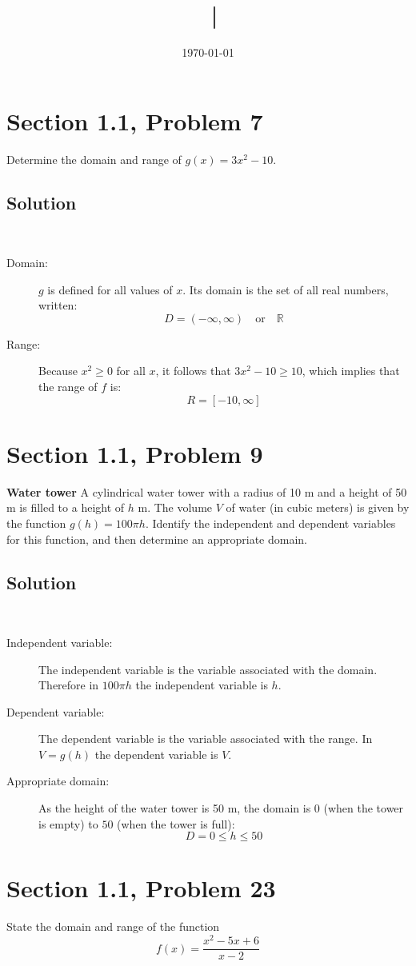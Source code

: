 \documentclass{article}
\title{\classname\ | \assignment}
\author{\authorname}
\date{\today}
\newcommand{\problem}[2]{\vspace{5ex}\section*{Section #1, Problem #2}}
\newcommand{\solution}{\subsection*{Solution}}
\begin{document}
\maketitle

\problem{1.1}{7}
Determine the domain and range of $ g(x) = 3x^2 - 10 $.

\solution\
\begin{description}
  \item[Domain:] $g$ is defined for all values of $x$. Its domain is the set of all real numbers, written:
    \[
      D = (-\infty, \infty) \quad \text{or} \quad \mathbb{R}
    \]
  \item[Range:] Because $x^2 \geq 0$ for all $x$, it follows that $3x^2 - 10 \geq 10$, which implies
    that the range of $f$ is:
    \[
      R = [-10, \infty]
    \]
\end{description}

\problem{1.1}{9}
\textbf{Water tower} A cylindrical water tower with a radius of 10 m and a height
of 50 m is filled to a height of $h$ m. The volume $V$ of water (in cubic meters) is given by the
function $g(h) = 100\pi h$. Identify the independent and dependent variables for this function, and then
determine an appropriate domain.

\solution\
\begin{description}
\item[Independent variable:] The independent variable is the variable associated with the domain.
  Therefore in $100\pi h$ the independent variable is $h$.
\item[Dependent variable:] The dependent variable is the variable associated with the range. In
  $V = g(h)$ the dependent variable is $V$.
\item[Appropriate domain:] As the height of the water tower is 50 m, the domain is $0$ (when the
  tower is empty) to $50$ (when the tower is full):
  \[
    D = 0 \leq h \leq 50
  \]
\end{description}

\problem{1.1}{23}
State the domain and range of the function
\[
  f(x) = \frac{x^2 - 5x + 6}{x - 2}
\]
\end{document}
